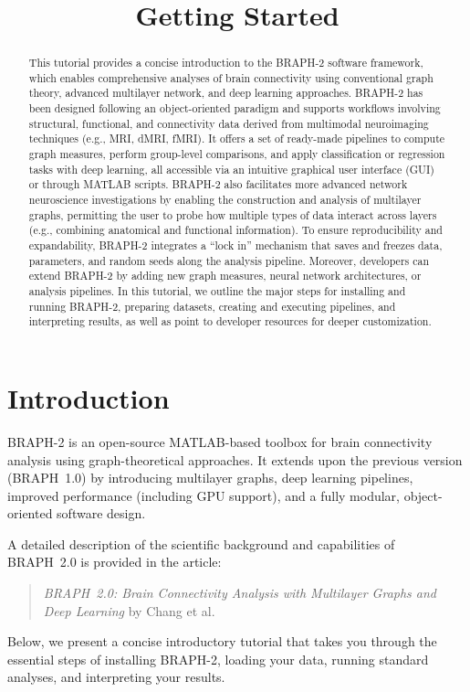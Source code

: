 \documentclass[justified]{tufte-handout}
\title{Getting Started}
\begin{document}
\maketitle

\begin{abstract}
\noindent
This tutorial provides a concise introduction to the BRAPH-2 software framework, which enables comprehensive analyses of brain connectivity using conventional graph theory, advanced multilayer network, and deep learning approaches. BRAPH-2 has been designed following an object-oriented paradigm and supports workflows involving structural, functional, and connectivity data derived from multimodal neuroimaging techniques (e.g., MRI, dMRI, fMRI). It offers a set of ready-made pipelines to compute graph measures, perform group-level comparisons, and apply classification or regression tasks with deep learning, all accessible via an intuitive graphical user interface (GUI) or through MATLAB scripts. BRAPH-2 also facilitates more advanced network neuroscience investigations by enabling the construction and analysis of multilayer graphs, permitting the user to probe how multiple types of data interact across layers (e.g., combining anatomical and functional information). To ensure reproducibility and expandability, BRAPH-2 integrates a ``lock in'' mechanism that saves and freezes data, parameters, and random seeds along the analysis pipeline. Moreover, developers can extend BRAPH-2 by adding new graph measures, neural network architectures, or analysis pipelines. In this tutorial, we outline the major steps for installing and running BRAPH-2, preparing datasets, creating and executing pipelines, and interpreting results, as well as point to developer resources for deeper customization.
\end{abstract}

\tableofcontents

\clearpage

\section{Introduction}

BRAPH-2 is an open-source MATLAB-based toolbox for brain connectivity analysis using graph-theoretical approaches. 
It extends upon the previous version (BRAPH~1.0) by introducing multilayer graphs, deep learning pipelines, improved performance (including GPU support), and a fully modular, object-oriented software design.

A detailed description of the scientific background and capabilities of BRAPH~2.0 is provided in the article:
\begin{quote}
\textit{BRAPH~2.0: Brain Connectivity Analysis with Multilayer Graphs and Deep Learning} by Chang et al.
\end{quote}
Below, we present a concise introductory tutorial that takes you through the essential steps of installing BRAPH-2, loading your data, running standard analyses, and interpreting your results.
\end{document}
